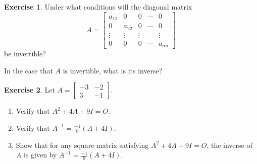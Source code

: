 \documentclass[handout]{beamer}
\newcommand{\fn}{\insertframenumber}
\theoremstyle{definition}
\newtheorem{exercise}{Exercise}
\begin{document}
\begin{frame}{\fn}
	\begin{exercise}
		Under what conditions will the diagonal matrix
			\[A=\begin{bmatrix}a_{11}&0&0&\cdots&0\\
				0&a_{22}&0&\cdots&0\\
				\vdots&\vdots&\vdots&&\vdots\\
				0&0&0&\cdots&a_{nn}\end{bmatrix}\]
		be invertible? 
		
		In the case that $A$ is invertible, what is its inverse?
	\end{exercise}
\end{frame}
\begin{frame}{\fn}
	\begin{exercise}
		Let $A=\left[\begin{array}{rr}
	-3 & -2 \\
	3 & -1
	\end{array}\right]$.
	\begin{enumerate}[label=(\alph*)]
		\item Verify that $A^2+4A+9I=O$.
		\item Verify that $A^{-1}=\frac{-1}{9}(A+4I)$.
		\item Show that for any square matrix satisfying $A^2+4A+9I=O$, the inverse of $A$ is given by $A^{-1}=\frac{-1}{9}(A+4I)$.
	\end{enumerate}
	\end{exercise}
\end{frame}
\end{document}
